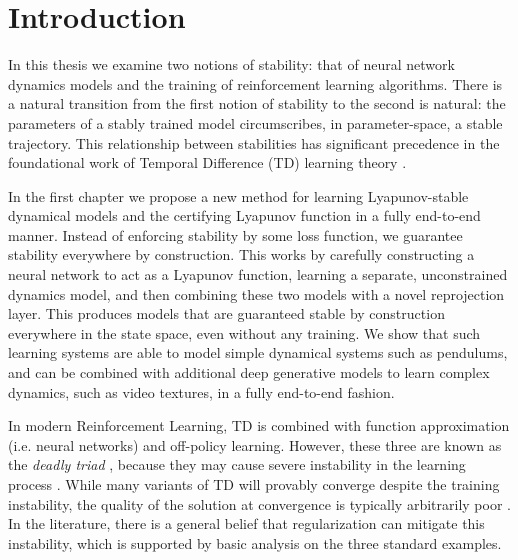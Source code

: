 \documentclass[12pt]{cmuthesis}
\begin{document}
\cleardoublepage

\tableofcontents

\cleardoublepage

\linenumbers

\chapter{Introduction}

In this thesis we examine two notions of stability: that of neural network dynamics models and the training of reinforcement learning algorithms. There is a natural transition from the first notion of stability to the second is natural: the parameters of a stably trained model circumscribes, in parameter-space, a stable trajectory.
This relationship between stabilities has significant precedence in the foundational work of Temporal Difference (TD) learning theory \cite{tsitsiklis1996analysis}.

In the first chapter we propose a new method for learning Lyapunov-stable dynamical models and the certifying Lyapunov function in a fully end-to-end manner. Instead of enforcing stability by some loss function, we guarantee stability everywhere by construction.
This works by carefully constructing a neural network to act as a Lyapunov function, learning a separate, unconstrained dynamics model, and then combining these two models with a novel reprojection layer. This produces models that are guaranteed stable by construction everywhere in the state space, even without any training. We show that such learning systems are able to model simple dynamical systems such as pendulums, and can be combined with additional deep generative models to learn complex dynamics, such as video textures, in a fully end-to-end fashion.

In modern Reinforcement Learning, TD is combined with function approximation (i.e. neural networks) and off-policy learning. However, these three are known as the \emph{deadly triad} \cite[p.~264]{sutton2020reinforcement}, because they may cause severe instability in the learning process \citet{tsitsiklis1996analysis}. While many variants of TD will provably converge despite the training instability, the quality of the solution at convergence is typically arbitrarily poor \citep{kolter2011fixed}. In the literature, there is a general belief that regularization can mitigate this instability, which is supported by basic analysis on the three standard examples.
\end{document}
